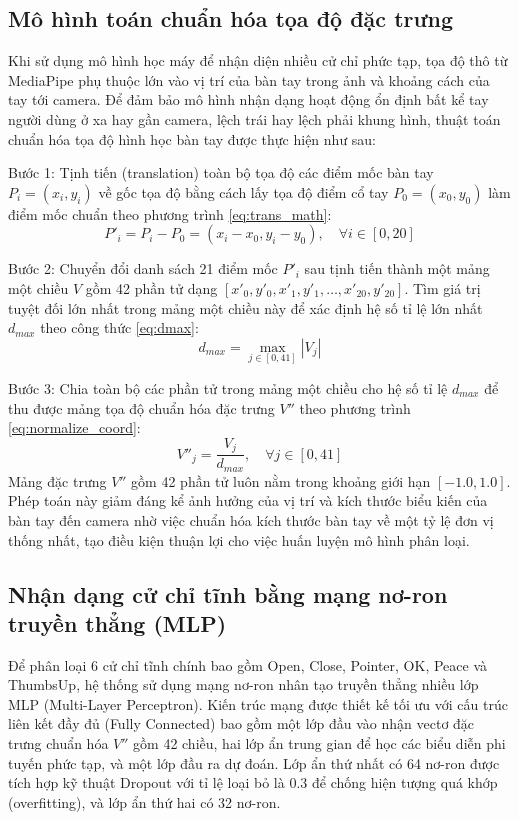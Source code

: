 \documentclass[../BTL.tex]{subfiles}
\begin{document}
\subsection{Mô hình toán chuẩn hóa tọa độ đặc trưng}
Khi sử dụng mô hình học máy để nhận diện nhiều cử chỉ phức tạp, tọa độ thô từ MediaPipe phụ thuộc lớn vào vị trí của bàn tay trong ảnh và khoảng cách của tay tới camera. Để đảm bảo mô hình nhận dạng hoạt động ổn định bất kể tay người dùng ở xa hay gần camera, lệch trái hay lệch phải khung hình, thuật toán chuẩn hóa tọa độ hình học bàn tay được thực hiện như sau:

Bước 1: Tịnh tiến (translation) toàn bộ tọa độ các điểm mốc bàn tay $P_i = (x_i, y_i)$ về gốc tọa độ bằng cách lấy tọa độ điểm cổ tay $P_0 = (x_0, y_0)$ làm điểm mốc chuẩn theo phương trình \eqref{eq:trans_math}:
\begin{equation}
\label{eq:trans_math}
P'_i = P_i - P_0 = (x_i - x_0, y_i - y_0), \quad \forall i \in [0, 20]
\end{equation}

Bước 2: Chuyển đổi danh sách 21 điểm mốc $P'_i$ sau tịnh tiến thành một mảng một chiều $V$ gồm 42 phần tử dạng $[x'_0, y'_0, x'_1, y'_1, \dots, x'_{20}, y'_{20}]$. Tìm giá trị tuyệt đối lớn nhất trong mảng một chiều này để xác định hệ số tỉ lệ lớn nhất $d_{max}$ theo công thức \eqref{eq:dmax}:
\begin{equation}
\label{eq:dmax}
d_{max} = \max_{j \in [0, 41]} |V_j|
\end{equation}

Bước 3: Chia toàn bộ các phần tử trong mảng một chiều cho hệ số tỉ lệ $d_{max}$ để thu được mảng tọa độ chuẩn hóa đặc trưng $V''$ theo phương trình \eqref{eq:normalize_coord}:
\begin{equation}
\label{eq:normalize_coord}
V''_j = \frac{V_j}{d_{max}}, \quad \forall j \in [0, 41]
\end{equation}
Mảng đặc trưng $V''$ gồm 42 phần tử luôn nằm trong khoảng giới hạn $[-1.0, 1.0]$. Phép toán này giảm đáng kể ảnh hưởng của vị trí và kích thước biểu kiến của bàn tay đến camera nhờ việc chuẩn hóa kích thước bàn tay về một tỷ lệ đơn vị thống nhất, tạo điều kiện thuận lợi cho việc huấn luyện mô hình phân loại.

\subsection{Nhận dạng cử chỉ tĩnh bằng mạng nơ-ron truyền thẳng (MLP)}
Để phân loại 6 cử chỉ tĩnh chính bao gồm Open, Close, Pointer, OK, Peace và ThumbsUp, hệ thống sử dụng mạng nơ-ron nhân tạo truyền thẳng nhiều lớp MLP (Multi-Layer Perceptron). Kiến trúc mạng được thiết kế tối ưu với cấu trúc liên kết đầy đủ (Fully Connected) bao gồm một lớp đầu vào nhận vectơ đặc trưng chuẩn hóa $V''$ gồm 42 chiều, hai lớp ẩn trung gian để học các biểu diễn phi tuyến phức tạp, và một lớp đầu ra dự đoán. Lớp ẩn thứ nhất có 64 nơ-ron được tích hợp kỹ thuật Dropout với tỉ lệ loại bỏ là $0.3$ để chống hiện tượng quá khớp (overfitting), và lớp ẩn thứ hai có 32 nơ-ron. 
\end{document}
